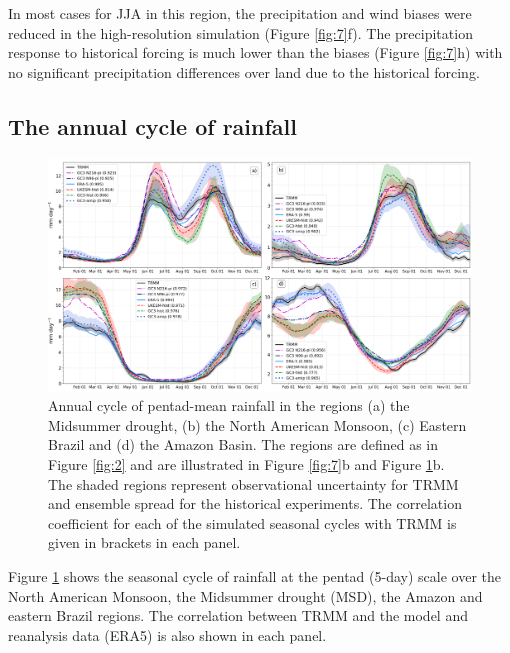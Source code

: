 In most cases for JJA in this region, the precipitation and wind biases were reduced in the high-resolution simulation (Figure \ref{fig:7}f).
The precipitation response to historical forcing is much lower than the biases (Figure \ref{fig:7}h) with no significant precipitation differences over land due to the historical forcing. %
 

\subsection{The annual cycle of rainfall}\label{sq:raincycle}

\begin{figure}[b!]
\centering
 \includegraphics[width=1.0\linewidth]{figures/amipseasonalcycle.png}
\caption{Annual cycle of pentad-mean rainfall in the regions (a) the Midsummer drought, (b) the North American Monsoon, (c) Eastern Brazil and (d) the Amazon Basin. The regions are defined as in Figure \ref{fig:2} and are illustrated in Figure \ref{fig:7}b and Figure \ref{fig:8}b. The shaded regions represent observational uncertainty for TRMM and ensemble spread for the historical experiments. The correlation coefficient for each of the simulated seasonal cycles with TRMM is given in brackets in each panel.  }
\label{fig:8}
\end{figure}


Figure \ref{fig:8} shows the seasonal cycle of rainfall at the pentad (5-day) scale over the North American Monsoon, the  Midsummer drought (MSD), the Amazon and eastern Brazil regions. The correlation between TRMM and the model and reanalysis data (ERA5) is also shown in each panel. 


